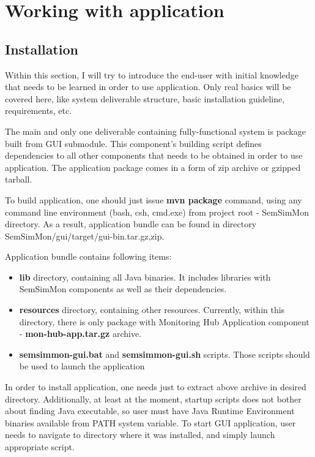 %

\section{Working with application}

\subsection{Installation}
\label{sec:ch7_working_with}

Within this section, I will try to introduce the end-user with initial knowledge that needs to be learned in order to use application. Only real basics will be covered here, like system deliverable structure, basic installation guideline, requirements, etc.

The main and only one deliverable containing fully-functional system is package built from GUI submodule. This component\rq{}s building script defines dependencies to all other components that needs to be obtained in order to use application. The application package comes in a form of zip archive or gzipped tarball. 

To build application, one should just issue {\bf mvn package} command, using any command line environment (bash, csh, cmd.exe) from project root - SemSimMon directory. As a result, application bundle can be found in directory SemSimMon/gui/target/gui-bin.{tar.gz,zip}.

Application bundle contains following items:
\begin{itemize}
  \item {\bf lib} directory, containing all Java binaries. It includes libraries with SemSimMon components as well as their dependencies.
  \item {\bf resources} directory, containing other resources. Currently, within this directory, there is only package with Monitoring Hub Application component - {\bf mon-hub-app.tar.gz} archive.
  \item {\bf semsimmon-gui.bat} and {\bf semsimmon-gui.sh} scripts. Those scripts should be used to launch the application	
\end{itemize}  

In order to install application, one needs just to extract above archive in desired directory. Additionally, at least at the moment, startup scripts does not bother about finding Java executable, so user must have Java Runtime Environment binaries available from PATH system variable. To start GUI application, user needs to navigate to directory where it was installed, and simply launch appropriate script.

